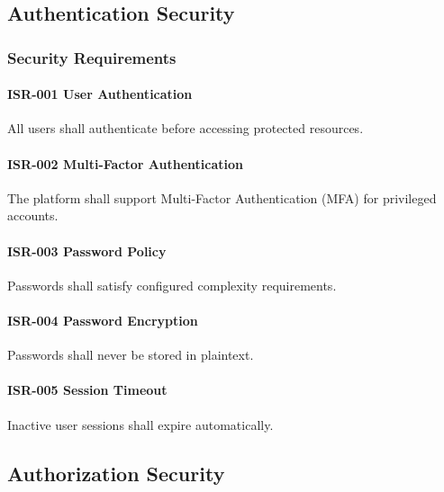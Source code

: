 
\subsection{Authentication Security}

\subsubsection*{Security Requirements}

\paragraph{ISR-001 User Authentication}

All users shall authenticate before accessing protected resources.

\paragraph{ISR-002 Multi-Factor Authentication}

The platform shall support Multi-Factor Authentication (MFA) for
privileged accounts.

\paragraph{ISR-003 Password Policy}

Passwords shall satisfy configured complexity requirements.

\paragraph{ISR-004 Password Encryption}

Passwords shall never be stored in plaintext.

\paragraph{ISR-005 Session Timeout}

Inactive user sessions shall expire automatically.


\subsection{Authorization Security}


